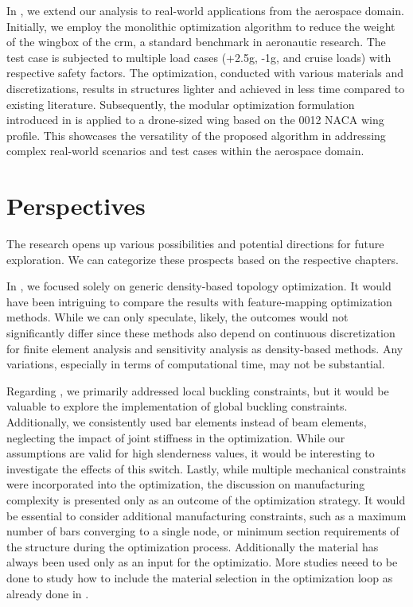 In , we extend our analysis to real-world applications from the aerospace domain. Initially, we employ the monolithic optimization algorithm to reduce the weight of the wingbox of the \gls{crm}, a standard benchmark in aeronautic research. The test case is subjected to multiple load cases (+2.5g, -1g, and cruise loads) with respective safety factors. The optimization, conducted with various materials and discretizations, results in structures lighter and achieved in less time compared to existing literature. Subsequently, the modular optimization formulation introduced in  is applied to a drone-sized wing based on the 0012 NACA wing profile. This showcases the versatility of the proposed algorithm in addressing complex real-world scenarios and test cases within the aerospace domain.

\section*{Perspectives}
The research opens up various possibilities and potential directions for future exploration. We can categorize these prospects based on the respective chapters.

In , we focused solely on generic density-based topology optimization. It would have been intriguing to compare the results with feature-mapping optimization methods. While we can only speculate, likely, the outcomes would not significantly differ since these methods also depend on continuous discretization for finite element analysis and sensitivity analysis as density-based methods. Any variations, especially in terms of computational time, may not be substantial.

Regarding , we primarily addressed local buckling constraints, but it would be valuable to explore the implementation of global buckling constraints. Additionally, we consistently used bar elements instead of beam elements, neglecting the impact of joint stiffness in the optimization. While our assumptions are valid for high slenderness values, it would be interesting to investigate the effects of this switch. Lastly, while multiple mechanical constraints were incorporated into the optimization, the discussion on manufacturing complexity is presented only as an outcome of the optimization strategy. It would be essential to consider additional manufacturing constraints, such as a maximum number of bars converging to a single node, or minimum section requirements of the structure during the optimization process. Additionally the material has always been used only as an input for the optimizatio. More studies neeed to be done to study how to include the material selection in the optimization loop as already done in .

